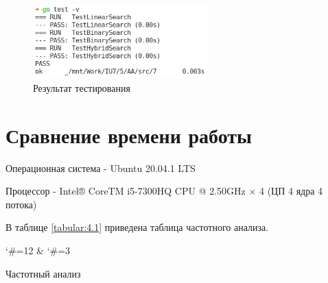 \begin{figure}[h]
    \centering
    \includegraphics[width=0.6\textwidth]{7/inc/test.png}
    \caption{Результат тестирования}
    \label{fig:4.2}
\end{figure}



\section{Сравнение времени работы}

Операционная система - Ubuntu 20.04.1 LTS

Процессор - Intel® CoreTM i5-7300HQ CPU @ 2.50GHz × 4 (ЦП 4 ядра 4 потока)

В таблице \ref{tabular:4.1} приведена таблица частотного анализа.


\setlength\tabcolsep{0.2cm}


\begin{table}[h]
    \centering
    \catcode`\#=12  %
    { \csvcoli & \csvcolii}
    \catcode`\#=3   %
    \caption{\label{tabular:4.1} Частотный анализ}
\end{table}



